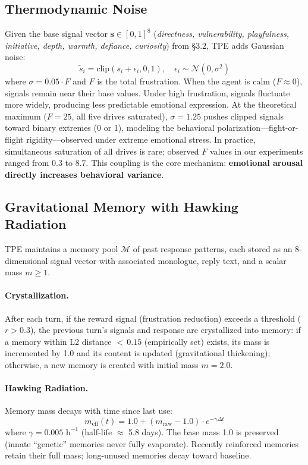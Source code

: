 \subsection{Thermodynamic Noise}

Given the base signal vector $\mathbf{s} \in [0,1]^8$ (\emph{directness, vulnerability, playfulness, initiative, depth, warmth, defiance, curiosity}) from \S3.2, TPE adds Gaussian noise:
\begin{equation}
    \tilde{s}_i = \text{clip}(s_i + \epsilon_i, 0, 1), \quad \epsilon_i \sim \mathcal{N}(0, \sigma^2)
\end{equation}
where $\sigma = 0.05 \cdot F$ and $F$ is the total frustration. When the agent is calm ($F \approx 0$), signals remain near their base values. Under high frustration, signals fluctuate more widely, producing less predictable emotional expression. At the theoretical maximum ($F = 25$, all five drives saturated), $\sigma = 1.25$ pushes clipped signals toward binary extremes (0 or 1), modeling the behavioral polarization---fight-or-flight rigidity---observed under extreme emotional stress. In practice, simultaneous saturation of all drives is rare; observed $F$ values in our experiments ranged from 0.3 to 8.7. This coupling is the core mechanism: \textbf{emotional arousal directly increases behavioral variance}.

\subsection{Gravitational Memory with Hawking Radiation}

TPE maintains a memory pool $\mathcal{M}$ of past response patterns, each stored as an 8-dimensional signal vector with associated monologue, reply text, and a scalar mass $m \geq 1$.

\paragraph{Crystallization.} After each turn, if the reward signal (frustration reduction) exceeds a threshold ($r > 0.3$), the previous turn's signals and response are crystallized into memory: if a memory within L2 distance ${<}\,0.15$ (empirically set) exists, its mass is incremented by 1.0 and its content is updated (gravitational thickening); otherwise, a new memory is created with initial mass $m = 2.0$.

\paragraph{Hawking Radiation.} Memory mass decays with time since last use:
\begin{equation}
    m_\text{eff}(t) = 1.0 + (m_\text{raw} - 1.0) \cdot e^{-\gamma \Delta t}
\end{equation}
where $\gamma = 0.005 \text{ h}^{-1}$ (half-life $\approx$ 5.8 days). The base mass 1.0 is preserved (innate ``genetic'' memories never fully evaporate). Recently reinforced memories retain their full mass; long-unused memories decay toward baseline.

